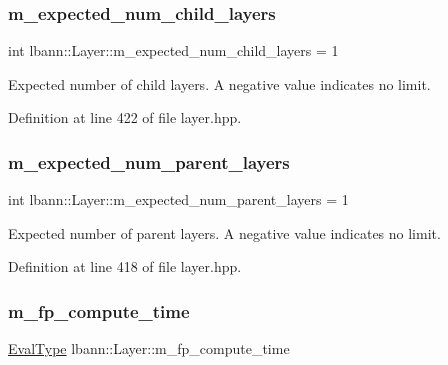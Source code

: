 \subsubsection{\texorpdfstring{m\+\_\+expected\+\_\+num\+\_\+child\+\_\+layers}{m\_expected\_num\_child\_layers}}
{\footnotesize\ttfamily int lbann\+::\+Layer\+::m\+\_\+expected\+\_\+num\+\_\+child\+\_\+layers = 1\hspace{0.3cm}{\ttfamily [protected]}}

Expected number of child layers. A negative value indicates no limit. 

Definition at line 422 of file layer.\+hpp.

\mbox{\label{classlbann_1_1Layer_a841b96b25555247f52921c7f13ae1dfa}} 
\subsubsection{\texorpdfstring{m\+\_\+expected\+\_\+num\+\_\+parent\+\_\+layers}{m\_expected\_num\_parent\_layers}}
{\footnotesize\ttfamily int lbann\+::\+Layer\+::m\+\_\+expected\+\_\+num\+\_\+parent\+\_\+layers = 1\hspace{0.3cm}{\ttfamily [protected]}}

Expected number of parent layers. A negative value indicates no limit. 

Definition at line 418 of file layer.\+hpp.

\mbox{\label{classlbann_1_1Layer_aa4e439c1d6a656e709dc4736c9380476}} 
\subsubsection{\texorpdfstring{m\+\_\+fp\+\_\+compute\+\_\+time}{m\_fp\_compute\_time}}
{\footnotesize\ttfamily \hyperlink{base_8hpp_a3266f5ac18504bbadea983c109566867}{Eval\+Type} lbann\+::\+Layer\+::m\+\_\+fp\+\_\+compute\+\_\+time\hspace{0.3cm}{\ttfamily [protected]}}

